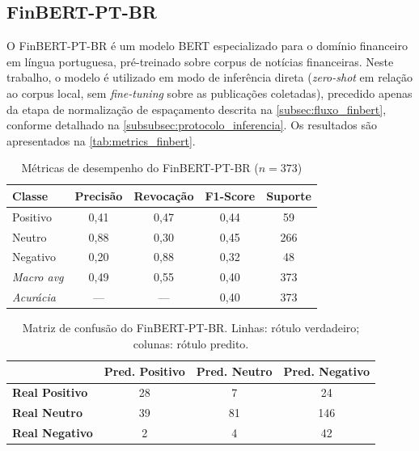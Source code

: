 
\subsection{FinBERT-PT-BR}
\label{subsec:res_finbert}

O FinBERT-PT-BR \cite{santos2023finbert} é um modelo BERT especializado para o domínio financeiro em língua portuguesa, pré-treinado sobre corpus de notícias financeiras. Neste trabalho, o modelo é utilizado em modo de inferência direta (\textit{zero-shot} em relação ao corpus local, sem \textit{fine-tuning} sobre as publicações coletadas), precedido apenas da etapa de normalização de espaçamento descrita na \autoref{subsec:fluxo_finbert}, conforme detalhado na \autoref{subsubsec:protocolo_inferencia}. Os resultados são apresentados na \autoref{tab:metrics_finbert}.

\begin{table}[!htbp]
	\caption[Métricas de desempenho — FinBERT-PT-BR]{Métricas de desempenho do FinBERT-PT-BR ($n = 373$)}
	\label{tab:metrics_finbert}
	\centering
	\begin{tabular}{lcccc}
		\hline
		\textbf{Classe}    & \textbf{Precisão} & \textbf{Revocação} & \textbf{F1-Score} & \textbf{Suporte} \\
		\hline
		Positivo           & 0,41              & 0,47               & 0,44              & 59  \\
		\hline
		Neutro             & 0,88              & 0,30               & 0,45              & 266 \\
		\hline
		Negativo           & 0,20              & 0,88               & 0,32              & 48  \\
		\hline
		\textit{Macro avg} & 0,49              & 0,55               & 0,40              & 373 \\
		\hline
		\textit{Acurácia}  & ---               & ---                & 0,40              & 373 \\
		\hline
	\end{tabular}
\end{table}

\begin{table}[!htbp]
	\caption[Matriz de confusão — FinBERT-PT-BR]{Matriz de confusão do FinBERT-PT-BR. Linhas: rótulo verdadeiro; colunas: rótulo predito.}
	\label{tab:cm_finbert}
	\centering
	\begin{tabular}{lccc}
		\hline
		& \textbf{Pred. Positivo} & \textbf{Pred. Neutro} & \textbf{Pred. Negativo} \\
		\hline
		\textbf{Real Positivo} & 28                      & 7                     & 24                      \\
		\hline
		\textbf{Real Neutro}   & 39                      & 81                    & 146                     \\
		\hline
		\textbf{Real Negativo} & 2                       & 4                     & 42                      \\
		\hline
	\end{tabular}
\end{table}

